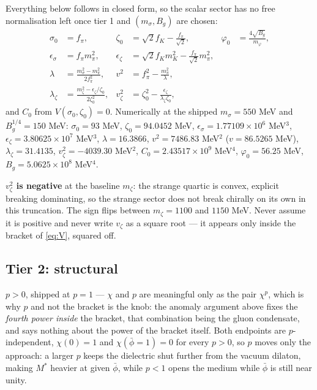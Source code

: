\documentclass[11pt,a4paper]{article}
\begin{document}
Everything below follows in closed form, so the scalar sector has no free
normalisation left once tier 1 and $(m_\sigma, B_g)$ are chosen:
\begin{align}
\sigma_0 &= f_\pi, &
\zeta_0 &= \sqrt2 f_K - \frac{f_\pi}{\sqrt2}, &
\varphi_0 &= \frac{4\sqrt{B_g}}{m_\varphi}, \\
\epsilon_\sigma &= f_\pi m_\pi^2, &
\epsilon_\zeta &= \sqrt2 f_K m_K^2 - \frac{f_\pi}{\sqrt2}m_\pi^2, & & \\
\lambda &= \frac{m_\sigma^2-m_\pi^2}{2f_\pi^2}, &
v^2 &= f_\pi^2 - \frac{m_\pi^2}{\lambda}, & & \\
\lambda_\zeta &= \frac{m_\zeta^2-\epsilon_\zeta/\zeta_0}{2\zeta_0^2}, &
v_\zeta^2 &= \zeta_0^2 - \frac{\epsilon_\zeta}{\lambda_\zeta\zeta_0}, & &
\end{align}
and $C_0$ from $V(\sigma_0,\zeta_0)=0$. Numerically at the shipped
$m_\sigma=550$ MeV and $B_g^{1/4}=150$ MeV:
$\sigma_0=93$ MeV, $\zeta_0=94.0452$ MeV,
$\epsilon_\sigma=1.77109\times10^{6}$ MeV$^3$,
$\epsilon_\zeta=3.80625\times10^{7}$ MeV$^3$,
$\lambda=16.3866$, $v^2=7486.83$ MeV$^2$ ($v=86.5265$ MeV),
$\lambda_\zeta=31.4135$, $v_\zeta^2=-4039.30$ MeV$^2$,
$C_0=2.43517\times10^{9}$ MeV$^4$, $\varphi_0=56.25$ MeV,
$B_g=5.0625\times10^{8}$ MeV$^4$.

\textbf{$v_\zeta^2$ is negative} at the baseline $m_\zeta$: the strange quartic
is convex, explicit breaking dominating, so the strange sector does not break
chirally on its own in this truncation. The sign flips between $m_\zeta=1100$
and $1150$ MeV. Never assume it is positive and never write $v_\zeta$ as a
square root --- it appears only inside the bracket of \eqref{eq:V}, squared off.

\subsection{Tier 2: structural}
\label{sec:tier2}

$p>0$, shipped at $p=1$ --- $\chi$ and $p$ are meaningful only as the pair
$\chi^p$, which is why $p$ and not the bracket is the knob: the anomaly
argument above fixes the \emph{fourth power inside}
the bracket, that combination being the gluon condensate, and says nothing
about the power of the bracket itself. Both endpoints are $p$-independent,
$\chi(0)=1$ and $\chi(\bar\phi=1)=0$ for every $p>0$, so $p$ moves only the
approach: a larger $p$ keeps the dielectric shut further from the vacuum
dilaton, making $M^*$ heavier at given $\bar\phi$, while $p<1$ opens the
medium while $\bar\phi$ is still near unity.
\end{document}

